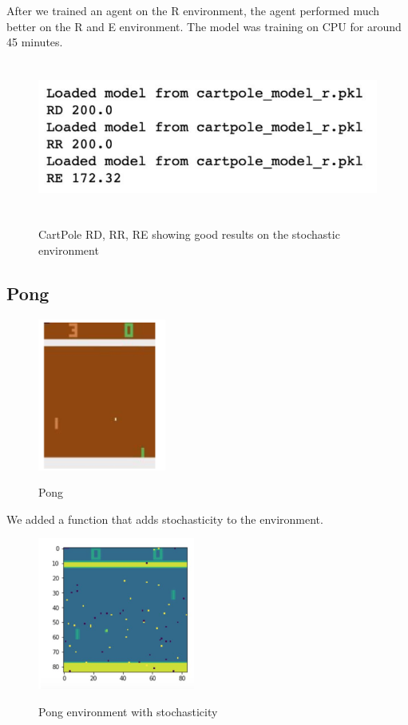 After we trained an agent on the R environment, the agent performed much better on the R and E environment. The model was training on CPU for around 45 minutes.

\begin{figure}[H]
\centering
\includegraphics[height=5cm]{CartPole_good_results.png}\\[0.5cm] 
\caption{CartPole RD, RR, RE showing good results on the stochastic environment}
\end{figure}

\subsection{Pong}

\begin{figure}[H]
\centering
\includegraphics[height=5cm]{Pong.png}\\[0.5cm] 
\caption{Pong}
\end{figure}

We added a function that adds stochasticity to the environment.

\begin{figure}[H]
\centering
\includegraphics[height=5cm]{Pong_stochasticity.png}\\[0.5cm] 
\caption{Pong environment with stochasticity}
\end{figure}

